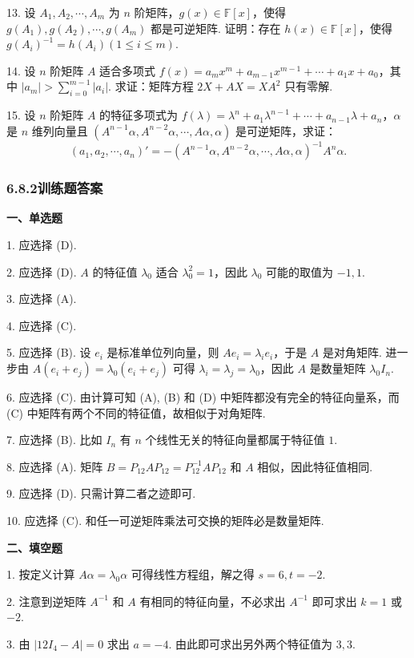 \documentclass[UTF8,12pt,a4paper,fontset=fandol]{ctexart}
\begin{document}
13. 设 $A_1,A_2,\cdots,A_m$ 为 $n$ 阶矩阵，$g(x)\in\mathbb{F}[x]$，使得 $g(A_1),g(A_2),\cdots,g(A_m)$ 都是可逆矩阵. 证明：存在 $h(x)\in\mathbb{F}[x]$，使得 $g(A_i)^{-1}=h(A_i)(1\le i\le m)$.

14. 设 $n$ 阶矩阵 $A$ 适合多项式 $f(x)=a_mx^m+a_{m-1}x^{m-1}+\cdots+a_1x+a_0$，其中 $|a_m|>\sum_{i=0}^{m-1}|a_i|$. 求证：矩阵方程 $2X+AX=XA^2$ 只有零解.

15. 设 $n$ 阶矩阵 $A$ 的特征多项式为 $f(\lambda)=\lambda^n+a_1\lambda^{n-1}+\cdots+a_{n-1}\lambda+a_n$，$\alpha$ 是 $n$ 维列向量且 $(A^{n-1}\alpha,A^{n-2}\alpha,\cdots,A\alpha,\alpha)$ 是可逆矩阵，求证：
\[
(a_1,a_2,\cdots,a_n)'=-(A^{n-1}\alpha,A^{n-2}\alpha,\cdots,A\alpha,\alpha)^{-1}A^n\alpha.
\]

\subsubsection*{6.8.2\quad 训练题答案}

\noindent\textbf{一、单选题}

1. 应选择 (D).

2. 应选择 (D). $A$ 的特征值 $\lambda_0$ 适合 $\lambda_0^2=1$，因此 $\lambda_0$ 可能的取值为 $-1,1$.

3. 应选择 (A).

4. 应选择 (C).

5. 应选择 (B). 设 $e_i$ 是标准单位列向量，则 $Ae_i=\lambda_ie_i$，于是 $A$ 是对角矩阵. 进一步由 $A(e_i+e_j)=\lambda_0(e_i+e_j)$ 可得 $\lambda_i=\lambda_j=\lambda_0$，因此 $A$ 是数量矩阵 $\lambda_0I_n$.

6. 应选择 (C). 由计算可知 (A), (B) 和 (D) 中矩阵都没有完全的特征向量系，而 (C) 中矩阵有两个不同的特征值，故相似于对角矩阵.

7. 应选择 (B). 比如 $I_n$ 有 $n$ 个线性无关的特征向量都属于特征值 $1$.

8. 应选择 (A). 矩阵 $B=P_{12}AP_{12}=P_{12}^{-1}AP_{12}$ 和 $A$ 相似，因此特征值相同.

9. 应选择 (D). 只需计算二者之迹即可.

10. 应选择 (C). 和任一可逆矩阵乘法可交换的矩阵必是数量矩阵.

\noindent\textbf{二、填空题}

1. 按定义计算 $A\alpha=\lambda_0\alpha$ 可得线性方程组，解之得 $s=6,t=-2$.

2. 注意到逆矩阵 $A^{-1}$ 和 $A$ 有相同的特征向量，不必求出 $A^{-1}$ 即可求出 $k=1$ 或 $-2$.

3. 由 $|12I_4-A|=0$ 求出 $a=-4$. 由此即可求出另外两个特征值为 $3,3$.
\end{document}
